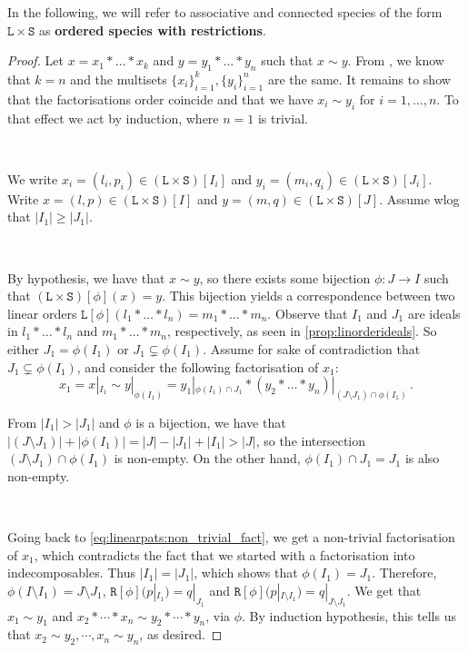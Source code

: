 \documentclass[12pt, reqno]{amsart}
\theoremstyle{definition}
\begin{document}
In the following, we will refer to associative and connected species of the form $\mathtt{L} \times \mathtt{S}$ as \textbf{ordered species with restrictions}.

\begin{proof}
Let $x = x_1 \ast \dots \ast x_k $ and $ y =  y_1 \ast \dots \ast y_n$ such that $x \sim y$.
From \cite[Corollary 3.4.]{Penaguiao2020}, we know that $k = n$ and the multisets $\{x_i\}_{i=1}^k,  \{y_i\}_{i=1}^n$ are the same.
It remains to show that the factorisations order coincide and that we have $x_i \sim y_i$ for $i = 1, \dots , n$.
To that effect we act by induction, where $n = 1$ is trivial.

\

We write $x_i = (l_i, p_i)\in (\mathtt{L}\times \mathtt{S})[I_i]$ and $y_i = (m_i, q_i)\in (\mathtt{L}\times \mathtt{S})[J_i]$.
Write $x = (l, p) \in (\mathtt{L}\times \mathtt{S})[I] $ and $y = (m, q) \in (\mathtt{L}\times \mathtt{S})[J]$.
Assume wlog that $|I_1 | \geq |J_1|$.

\

By hypothesis, we have that $x \sim y$, so there exists some bijection $\phi: J \to I$ such that $ (\mathtt{L}\times \mathtt{S})[\phi](x) = y$.
This bijection yields a correspondence between two linear orders $\mathtt{L} [\phi] (l_1 \ast \dots \ast l_n) = m_1\ast \dots \ast m_n $.
Observe that $I_1$ and $J_1$ are ideals in $l_1 \ast \dots \ast l_n$ and $m_1 \ast \dots \ast m_n$, respectively, as seen in \cref{prop:linorderideals}.
So either $J_1 = \phi (I_1)$ or $J_1 \subsetneq  \phi(I_1) $.
Assume for sake of contradiction that $J_1 \subsetneq  \phi(I_1)$, and consider the following factorisation of $x_1 $:
\begin{equation}\label{eq:linearpats:non_trivial_fact}
x_1 = x|_{I_1} \sim y|_{\phi(I_1)} = y_1|_{\phi(I_1) \cap J_1} \ast (y_2 \ast \dots \ast y_n)|_{(J\setminus J_1) \cap \phi(I_1)}\, . 
\end{equation}

From $|I_1| > |J_1|$ and $\phi $ is a bijection, we have that $| (J\setminus J_1) | + | \phi(I_1) | = |J| - |J_1| + |I_1| > |J|$, so the intersection $(J\setminus J_1) \cap \phi(I_1)$ is non-empty.
On the other hand, $\phi(I_1) \cap J_1 = J_1$ is also non-empty.

\

Going back to \eqref{eq:linearpats:non_trivial_fact}, we get a non-trivial factorisation of $x_1$, which contradicts the fact that we started with a factorisation into indecomposables. Thus $|I_1 | = |J_1|$, which shows that $\phi(I_1) = J_1$.
Therefore,  $\phi(I\setminus I_1) = J \setminus  J_1$, $ \mathtt{R}[\phi] (p|_{I_1}) = q|_{J_1} $ and $ \mathtt{R}[\phi] (p|_{I \setminus I_1}) = q|_{J \setminus J_1} $.
We get that $x_1 \sim y_1$ and $x_2 \ast \cdots \ast x_n \sim y_2 \ast \cdots \ast y_n$, via $\phi$.
By induction hypothesis, this tells us that $x_2 \sim y_2, \cdots , x_n \sim y_n$, as desired.
\end{proof}
\end{document}
